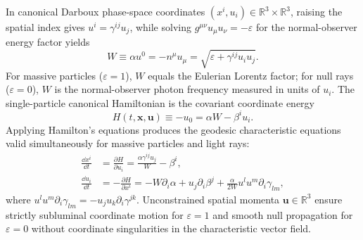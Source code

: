 In canonical Darboux phase-space coordinates $(x^i, u_i) \in \mathbb{R}^3 \times \mathbb{R}^3$, raising the spatial index gives $u^i = \gamma^{ij} u_j$, while solving $g^{\mu\nu} u_\mu u_\nu = -\varepsilon$ for the normal-observer energy factor yields
\begin{equation}\label{eq:lorentz_w}
W \equiv \alpha u^0 = -n^\mu u_\mu = \sqrt{\varepsilon + \gamma^{ij} u_i u_j}.
\end{equation}
For massive particles ($\varepsilon = 1$), $W$ equals the Eulerian Lorentz factor; for null rays ($\varepsilon = 0$), $W$ is the normal-observer photon frequency measured in units of $u_i$. The single-particle canonical Hamiltonian is the covariant coordinate energy
\begin{equation}\label{eq:darboux_H}
H(t, \bm{x}, \bm{u}) \equiv -u_0 = \alpha W - \beta^i u_i.
\end{equation}
Applying Hamilton's equations produces the geodesic characteristic equations valid simultaneously for massive particles and light rays:
\begin{align}\label{eq:characteristics}
\frac{\dd x^i}{\dd t} &= \frac{\partial H}{\partial u_i} = \frac{\alpha \gamma^{ij} u_j}{W} - \beta^i, \nonumber\\
\frac{\dd u_i}{\dd t} &= -\frac{\partial H}{\partial x^i} = -W \partial_i \alpha + u_j \partial_i \beta^j + \frac{\alpha}{2W} u^l u^m \partial_i \gamma_{lm},
\end{align}
where $u^l u^m \partial_i \gamma_{lm} = -u_j u_k \partial_i \gamma^{jk}$. Unconstrained spatial momenta $\bm{u} \in \mathbb{R}^3$ ensure strictly subluminal coordinate motion for $\varepsilon = 1$ and smooth null propagation for $\varepsilon = 0$ without coordinate singularities in the characteristic vector field.

